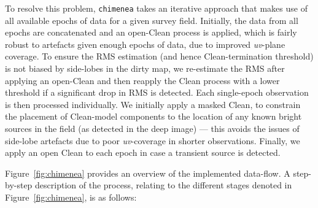 \documentclass[5p,authoryear]{elsarticle}
\begin{document}
To resolve this problem, \texttt{chimenea} takes an iterative approach that makes use of all available epochs of data for a given survey field.
Initially, the data from all epochs are concatenated and an open-Clean process is applied, which is fairly robust to artefacts given enough epochs of data, due to improved \textit{uv}-plane coverage. 
To ensure the RMS estimation (and hence Clean-termination threshold) is not biased by side-lobes in the dirty map, we re-estimate the RMS after applying an open-Clean and then reapply the Clean process with a lower threshold if a significant drop in RMS is detected.
Each single-epoch observation is then processed individually. 
We initially apply a masked Clean, to constrain the placement of Clean-model components to the location of any known bright sources in the field (as detected in the deep image) --- this avoids the issues of side-lobe artefacts due to poor \textit{uv}-coverage in shorter observations. 
Finally, we apply an open Clean to each epoch in case a transient source is detected.

Figure~\ref{fig:chimenea} provides an overview of the implemented data-flow. 
A step-by-step description of the process, relating to the different stages denoted in Figure~\ref{fig:chimenea}, is as follows:
\end{document}
